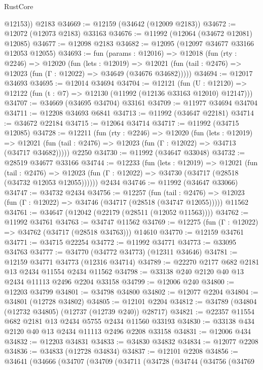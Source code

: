 \begin{lexlean}{RustCore}
\begin{coremodule}
        @12153))
    @2183
@34669 := @12159 (@34642 (@12009 @2183))
@34672 := @12072 (@12073 @2183) @33163
@34676 := @11992 (@12064 (@34672 @12081) @12085)
@34677 := @12098 @2183
@34682 := @12095 (@12097 @34677 @33166 @12053 @12055)
@34693 := fun (params : @12016) =>
  @12018
    (fun (rty : @2246) =>
    @12020
      (fun (lets : @12019) =>
      @12021 (fun (tail : @2476) => @12023 (fun (Γ : @12022) => @34649 (@34676 @34682)))))
@34694 := @12017 @34693
@34695 := @12014 @34694
@34704 := @12121
    (fun (U : @12120) => @12122 (fun (t : @7) => @12130 (@11992 (@12136 @33163 @12010) @12147)))
@34707 := @34669 (@34695 @34704) @33161
@34709 := @11977 @34694 @34704
@34711 := @12208 @34693 @6841
@34713 := @11992 (@34647 @22181)
@34714 := @34672 @22184
@34715 := @12064 @34714
@34717 := @11992 (@34715 @12085)
@34728 := @12211
    (fun (rty : @2246) =>
    @12020
      (fun (lets : @12019) =>
      @12021 (fun (tail : @2476) => @12023 (fun (Γ : @12022) => @34713 (@34717 @34682)))))
    @2250
@34730 := @11992 (@34647 @33048)
@34732 := @28519 @34677 @33166
@34744 := @12233
    (fun (lets : @12019) =>
    @12021
      (fun (tail : @2476) =>
      @12023 (fun (Γ : @12022) => @34730 (@34717 (@28518 (@34732 @12053 @12055))))))
    @2434
@34746 := @11992 (@34647 @33066)
@34747 := @34732 @2434
@34756 := @12257
    (fun (tail : @2476) => @12023 (fun (Γ : @12022) => @34746 (@34717 (@28518 (@34747 @12055)))))
    @11562
@34761 := @34647 (@12042 (@22179 (@28511 (@12052 @11563))))
@34762 := @11992 @34761
@34763 := @34747 @11562
@34769 := @12275 (fun (Γ : @12022) => @34762 (@34717 (@28518 @34763))) @14610
@34770 := @12159 @34761
@34771 := @34715 @22254
@34772 := @11992 @34771
@34773 := @33095 @34763
@34777 := @34770 (@34772 @34773) (@12311 @34646)
@34781 := @12159 @34771 @34773 (@12316 @34714)
@34789 := @22270 @2177 @682 @2181 @13 @2434 @11554 @2434 @11562
@34798 := @33138 @240 @2120 @40 @13 @2434 @11113 @2496 @2204 @33158
@34799 := @12006 @240
@34800 := @12203 @34799
@34801 := @34798 @34800
@34802 := @12077 @2204
@34804 := @34801 (@12728 @34802)
@34805 := @12101 @2204
@34812 := @34789 (@34804 (@12732 @34805) (@12737 (@12739 @240)) @28717)
@34821 := @22357 @11554 @682 @2181 @13 @2434 @5755 @2434 @11560 @33193
@34830 := @33138 @434 @2120 @40 @13 @2434 @11113 @2496 @2208 @33158
@34831 := @12006 @434
@34832 := @12203 @34831
@34833 := @34830 @34832
@34834 := @12077 @2208
@34836 := @34833 (@12728 @34834)
@34837 := @12101 @2208
@34856 := @34641
    (@34666
      (@34707
        (@34709
          (@34711
            (@34728
              (@34744
                (@34756
                  (@34769

\end{coremodule}
\end{lexlean}
